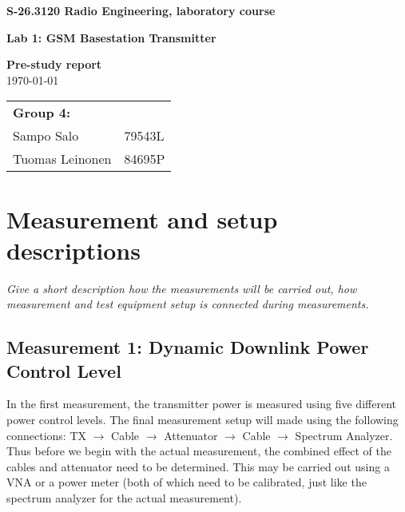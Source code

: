 \documentclass[a4paper, 12pt]{article}
\begin{document}
\begin{titlepage}
\pagestyle{empty}
\begin{center}

\vspace*{3cm}
\noindent\LARGE{\textbf{S-26.3120 Radio Engineering, laboratory course}}

\vspace*{2cm}

\Large{\textbf{Lab 1: GSM Basestation Transmitter}}\\

\vspace*{1.5cm}

\large{\textbf{Pre-study report}}\\
\vspace{1.5cm}
\large{\today}
	
\vspace*{3cm}
\large{
	\begin{tabular}{l l}
		\textbf{Group 4:} 	& \\
		Sampo Salo			& 79543L	\\
		Tuomas Leinonen 	& 84695P		
	\end{tabular}
}

\end{center}

\end{titlepage}

\section*{Measurement and setup descriptions}

\textit{Give a short description how the measurements will be carried out, 
how measurement and test equipment setup is connected during measurements.}


\subsection*{Measurement 1: Dynamic Downlink Power Control Level}

In the first measurement, the transmitter power is measured using five 
different power control levels. The final measurement setup will made 
using the following connections: TX $\rightarrow$ Cable $\rightarrow$ 
Attenuator $\rightarrow$ Cable $\rightarrow$ Spectrum Analyzer. Thus 
before we begin with the actual measurement, the combined effect of 
the cables and attenuator need to be determined. This may be carried 
out using a VNA or a power meter (both of which need to be calibrated, 
just like the spectrum analyzer for the actual measurement).
\end{document}
